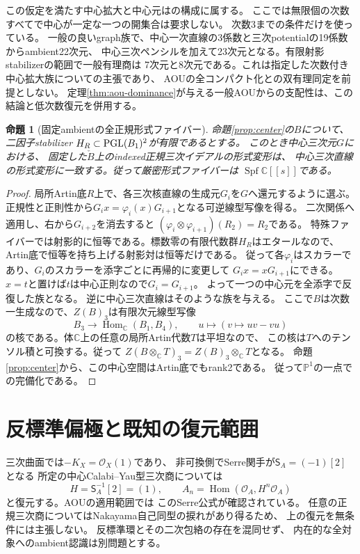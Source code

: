 \documentclass[11pt,a4paper]{ltjsarticle}
\newtheorem{proposition}[theorem]{命題}
\theoremstyle{definition}\newtheorem{remark}[theorem]{注意}
\newcommand{\PP}{\mathbb P}\newcommand{\kk}{\mathbb C}
\newcommand{\Hom}{\operatorname{Hom}}\newcommand{\HH}{\operatorname{HH}}
\newcommand{\OO}{\mathcal O}\newcommand{\rank}{\operatorname{rank}}
\begin{document}
この仮定を満たす中心拡大と中心元は\cite{LBS,EG,Pym}の構成に属する。
ここでは無限個の次数すべてで中心が一定な一つの開集合は要求しない。
次数3までの条件だけを使っている。
一般の良いgraph族で、中心一次直線の3係数と三次potentialの19係数からambient22次元、
中心三次ペンシルを加えて23次元となる。有限射影stabilizerの範囲で一般有理商は
7次元と8次元である。これは指定した次数付き中心拡大族についての主張であり、
AOUの全コンパクト化との双有理同定を前提としない。
定理\ref{thm:aou-dominance}が与える一般AOUからの支配性は、この結論と低次数復元を併用する。

\begin{proposition}[固定ambientの全正規形式ファイバー]\label{prop:normal}
命題\ref{prop:center}の$B$について、二因子stabilizer
$H_R\subset\operatorname{PGL}(B_1)^2$が有限であるとする。
このとき中心三次元$G$における、
固定した$\check B$上のindexed正規三次イデアルの形式変形は、
中心三次直線の形式変形に一致する。従って厳密形式ファイバーは
$\operatorname{Spf}\kk[[s]]$である。
\end{proposition}
\begin{proof}
局所Artin底$R$上で、各三次核直線の生成元$G_i$を$G$へ還元するように選ぶ。
正規性と正則性から$G_i x=\varphi_i(x)G_{i+1}$となる可逆線型写像を得る。
二次関係へ適用し、右から$G_{i+2}$を消去すると
$(\varphi_i\otimes\varphi_{i+1})(R_2)=R_2$である。
特殊ファイバーでは射影的に恒等である。標数零の有限代数群$H_R$はエタールなので、
Artin底で恒等を持ち上げる射影対は恒等だけである。
従って各$\varphi_i$はスカラーであり、$G_i$のスカラーを添字ごとに再帰的に変更して
$G_i x=xG_{i+1}$にできる。$x=t$と置けば$t$は中心正則なので$G_i=G_{i+1}$。
よって一つの中心元を全添字で反復した族となる。
逆に中心三次直線はそのような族を与える。
ここで$B$は次数一生成なので、$Z(B)_3$は有限次元線型写像
\[
 B_3\longrightarrow\Hom_\kk(B_1,B_4),\qquad
 u\longmapsto(v\mapsto uv-vu)
\]
の核である。体$\kk$上の任意の局所Artin代数$T$は平坦なので、
この核は$T$へのテンソル積と可換する。従って
$Z(B\otimes_\kk T)_3=Z(B)_3\otimes_\kk T$となる。
命題\ref{prop:center}から、この中心空間はArtin底でもrank2である。
従って$\PP^1$の一点での完備化である。
\end{proof}


\section{反標準偏極と既知の復元範囲}
三次曲面では$-K_X=\OO_X(1)$であり、
非可換側でSerre関手が$\mathsf S_A=(-1)[2]$となる
所定の中心Calabi--Yau型三次商については
\[
 H=\mathsf S_A^{-1}[2]=(1),\qquad
 A_n=\Hom(\OO_A,H^n\OO_A)
\]
と復元する。AOU\cite[Lemma 9.2]{AOU}の適用範囲では
このSerre公式が確認されている。
任意の正規三次商についてはNakayama自己同型の捩れがあり得るため、
上の復元を無条件には主張しない。
反標準環とその二次包絡の存在を混同せず、
内在的な全対象へのambient認識は別問題とする。
\end{document}
